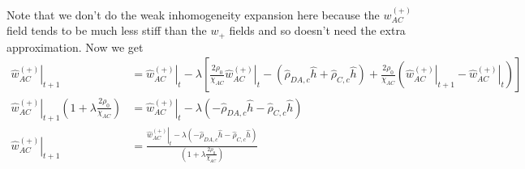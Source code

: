 \documentclass{article}
\begin{document}
    Note that we don't do the weak inhomogeneity expansion here because the
  $w_{AC}^{(+)}$ field tends to be much less stiff than the $w_+$ fields and so
  doesn't need the extra approximation.
  Now we get
  \begin{align*}
  \left. \hat{w}_{AC}^{(+)} \right|_{t+1} &=
  \left. \hat{w}_{AC}^{(+)} \right|_t - \lambda \left[
  \frac{2\rho_0}{\chi_{AC}} \left. \hat{w}_{AC}^{(+)} \right|_t
  - ( \hat{\rho}_{DA,c} \hat{h}
  + \hat{\rho}_{C,c} \hat{h} )
  + \frac{2\rho_0}{\chi_{AC}}
  ( \left. \hat{w}_{AC}^{(+)}\right|_{t+1}
  - \left. \hat{w}_{AC}^{(+)} \right|_t
  )
  \right] \\
  \left. \hat{w}_{AC}^{(+)} \right|_{t+1} ( 1 + \lambda \frac{2
  	\rho_0}{\chi_{AC}} ) &=
  \left. \hat{w}_{AC}^{(+)} \right|_t - \lambda \left(
  - \hat{\rho}_{DA,c} \hat{h}
  - \hat{\rho}_{C,c} \hat{h}
  \right) \\
  \left. \hat{w}_{AC}^{(+)} \right|_{t+1} &=
  \frac{
  	\left. \hat{w}_{AC}^{(+)} \right|_t - \lambda \left(
  	- \hat{\rho}_{DA,c} \hat{h}
  	- \hat{\rho}_{C,c} \hat{h}
  	\right)
  }
  {
  	\left( 1 + \lambda \frac{2 \rho_0}{\chi_{AC}} \right)
  }
  \end{align*}
  
  
  
\end{document}
